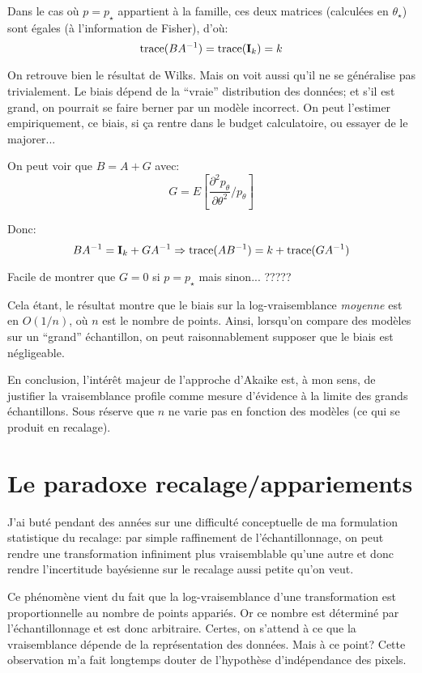\documentclass{article}
\begin{document}
Dans le cas o\`u $p=p_\star$ appartient \`a la famille, ces deux matrices (calcul\'ees en $\theta_\star$) sont \'egales (\`a l'information de Fisher), d'o\`u: 
$$
{\rm trace}(B A^{-1}) = {\rm trace}({\bf I}_k) = k
$$ 

On retrouve bien le r\'esultat de Wilks. Mais on voit aussi qu'il ne se g\'en\'eralise pas trivialement. Le biais d\'epend de la ``vraie'' distribution des donn\'ees; et s'il est grand, on pourrait se faire berner par un mod\`ele incorrect. On peut l'estimer empiriquement, ce biais, si \c{c}a rentre dans le budget calculatoire, ou essayer de le majorer... 

On peut voir que $B = A + G$ avec:
$$
G = E\left[\frac{\partial^2 p_\theta}{\partial\theta^2}\big / p_\theta\right]
$$ 

Donc:
$$B A^{-1} = {\bf I}_k + G A^{-1}
\Rightarrow
{\rm trace}(A B^{-1}) = k + {\rm trace}(G A^{-1})
$$ 

Facile de montrer que $G=0$ si $p=p_\star$ mais sinon... ????? 

Cela \'etant, le r\'esultat montre que le biais sur la log-vraisemblance {\em moyenne} est en $O(1/n)$, o\`u $n$ est le nombre de points. Ainsi, lorsqu'on compare des mod\`eles sur un ``grand'' \'echantillon, on peut raisonnablement supposer que le biais est n\'egligeable. 

En conclusion, l'int\'er\^et majeur de l'approche d'Akaike est, \`a mon sens, de justifier la vraisemblance profile comme mesure d'\'evidence \`a la limite des grands \'echantillons. Sous r\'eserve que $n$ ne varie pas en fonction des mod\`eles (ce qui se produit en recalage).



\section{Le paradoxe recalage/appariements}

J'ai but\'e pendant des ann\'ees sur une difficult\'e conceptuelle de ma formulation statistique du recalage: par simple raffinement de l'\'echantillonnage, on peut rendre une transformation infiniment plus vraisemblable qu'une autre et donc rendre l'incertitude bay\'esienne sur le recalage aussi petite qu'on veut. 

Ce ph\'enom\`ene vient du fait que la log-vraisemblance d'une transformation est proportionnelle au nombre de points appari\'es. Or ce nombre est d\'etermin\'e par l'\'echantillonnage et est donc arbitraire. Certes, on s'attend \`a ce que la vraisemblance d\'epende de la repr\'esentation des donn\'ees. Mais \`a ce point? Cette observation m'a fait longtemps douter de l'hypoth\`ese d'ind\'ependance des pixels. 
\end{document}
